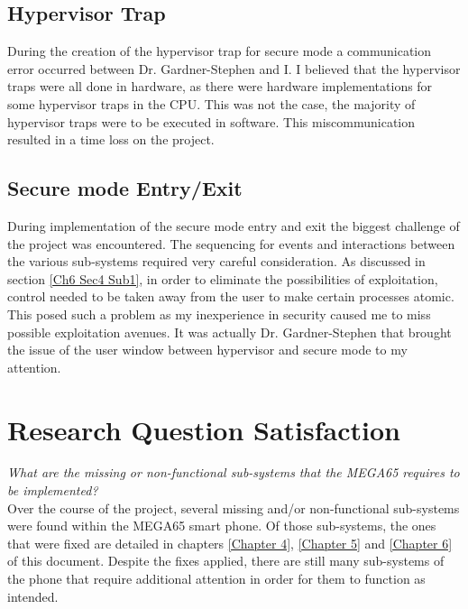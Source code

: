 \subsection{Hypervisor Trap}

\label{Ch7 Sec2 Sub2}

During the creation of the hypervisor trap for secure mode a communication error occurred between Dr. Gardner-Stephen and I. I believed that the hypervisor traps were all done in hardware, as there were hardware implementations for some hypervisor traps in the CPU. This was not the case, the majority of hypervisor traps were to be executed in software. This miscommunication resulted in a time loss on the project.

\subsection{Secure mode Entry/Exit}

\label{Ch7 Sec2 Sub3}

During implementation of the secure mode entry and exit the biggest challenge of the project was encountered. The sequencing for events and interactions between the various sub-systems required very careful consideration. As discussed in section \ref{Ch6 Sec4 Sub1}, in order to eliminate the possibilities of exploitation, control needed to be taken away from the user to make certain processes atomic. This posed such a problem as my inexperience in security caused me to miss possible exploitation avenues. It was actually Dr. Gardner-Stephen that brought the issue of the user window between hypervisor and secure mode to my attention.


\section{Research Question Satisfaction}

\label{Ch7 Sec3}

\textit{What are the missing or non-functional sub-systems that the MEGA65 requires to be implemented?}\\
Over the course of the project, several missing and/or non-functional sub-systems were found within the MEGA65 smart phone. 
Of those sub-systems, the ones that were fixed are detailed in chapters \ref{Chapter 4}, \ref{Chapter 5} and \ref{Chapter 6} of this document. 
Despite the fixes applied, there are still many sub-systems of the phone that require additional attention in order for them to function as intended.\\

